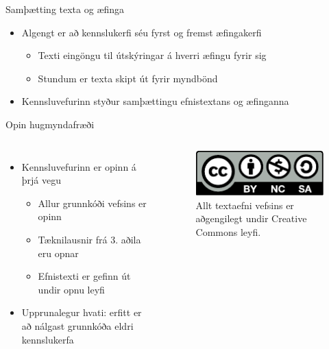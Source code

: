 \documentclass[hi-blar]{beamer}
\begin{document}
\begin{frame}{Samþætting texta og æfinga}
    \begin{itemize}
        \item Algengt er að kennslukerfi séu fyrst og fremst æfingakerfi
        \begin{itemize}
            \item Texti eingöngu til útskýringar á hverri æfingu fyrir sig
            \item Stundum er texta skipt út fyrir myndbönd
        \end{itemize}
        \item Kennsluvefurinn styður samþættingu efnistextans og æfinganna
    \end{itemize}
\end{frame}

\begin{frame}{Opin hugmyndafræði}
    \begin{columns}
        \begin{itemize}
            \item Kennsluvefurinn er opinn á þrjá vegu
            \begin{itemize}
                \item Allur grunnkóði vefsins er opinn
                \item Tæknilausnir frá 3. aðila eru opnar
                \item Efnistexti er gefinn út undir opnu leyfi
            \end{itemize}
            \item Upprunalegur hvati: erfitt er að nálgast grunnkóða eldri kennslukerfa
        \end{itemize}
        \begin{figure}
            \caption{Allt textaefni vefsins er aðgengilegt undir Creative Commons leyfi.}
            \includegraphics[width=\linewidth]{cc-by-nc-sa}
        \end{figure}
    \end{columns}
\end{frame}
\end{document}
